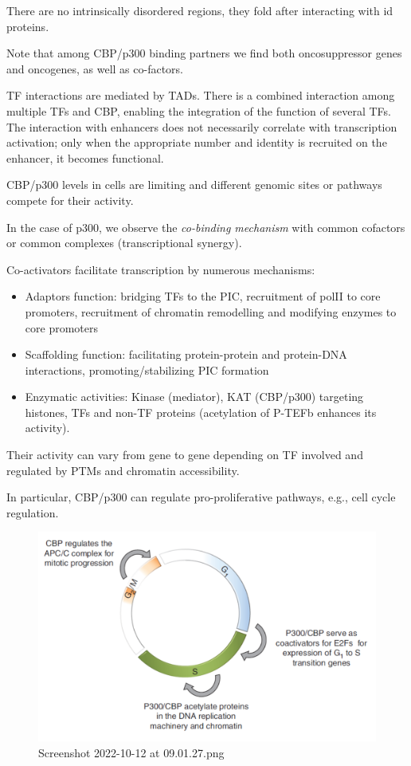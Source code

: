 There are no intrinsically disordered regions, they fold after interacting with id proteins.

Note that among CBP/p300 binding partners we find both oncosuppressor genes and oncogenes, as well as co-factors.

TF interactions are mediated by TADs. There is a combined interaction among multiple TFs and CBP, enabling the integration of the function of several TFs. The interaction with enhancers does not necessarily correlate with transcription activation; only when the appropriate number and identity is recruited on the enhancer, it becomes functional.

CBP/p300 levels in cells are limiting and different genomic sites or pathways compete for their activity.

In the case of p300, we observe the \emph{co-binding mechanism} with common cofactors or common complexes (transcriptional synergy).

Co-activators facilitate transcription by numerous mechanisms:

\begin{itemize}
\tightlist
\item
  Adaptors function: bridging TFs to the PIC, recruitment of polII to core promoters, recruitment of chromatin remodelling and modifying enzymes to core promoters
\item
  Scaffolding function: facilitating protein-protein and protein-DNA interactions, promoting/stabilizing PIC formation
\item
  Enzymatic activities: Kinase (mediator), KAT (CBP/p300) targeting histones, TFs and non-TF proteins (acetylation of P-TEFb enhances its activity).
\end{itemize}

Their activity can vary from gene to gene depending on TF involved and regulated by PTMs and chromatin accessibility.

In particular, CBP/p300 can regulate pro-proliferative pathways, e.g., cell cycle regulation.

\begin{figure}
\centering
\includegraphics[width=\textwidth]{../_resources/Screenshot_2022-10-12_at_09-01-27.png}
\caption{Screenshot 2022-10-12 at 09.01.27.png}
\end{figure}

